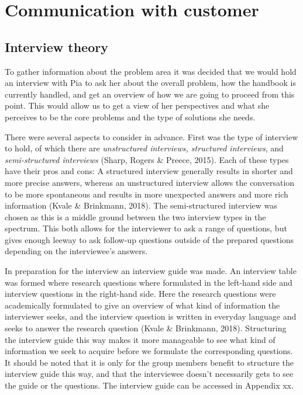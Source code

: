 \section{Communication with customer}

\subsection{Interview theory}

To gather information about the problem area it was decided that
we would hold an interview with Pia to ask her about the overall problem, how the handbook is currently handled, and get an overview of how we are going to proceed from this point. This would allow us to get a view of her perspectives and what she perceives to be the core problems and the type of solutions she needs.

There were several aspects to consider in advance. First was the type of interview to hold, of which there are \textit{unstructured interviews, structured interviews}, and \textit{semi-structured interviews} (Sharp, Rogers \& Preece, 2015). Each of these types have their pros and cons: A structured interview generally results in shorter and more precise answers, whereas an unstructured interview allows the conversation to be more spontaneous and results in more unexpected answers and more rich information (Kvale \& Brinkmann, 2018). The semi-structured interview was chosen as this is a middle ground between the two interview types in the spectrum. This both allows for the interviewer to ask a range of questions, but gives enough leeway to ask follow-up questions outside of the prepared questions depending on the interviewee’s answers.

In preparation for the interview an interview guide was made. An interview table was formed where research questions where formulated in the left-hand side and interview questions in the right-hand side. Here the research questions were academically formulated to give an overview of what kind of information the interviewer seeks, and the interview question is written in everyday language and seeks to answer the research question (Kvale \& Brinkmann, 2018). Structuring the interview guide this way makes it more manageable to see what kind of information we seek to acquire before we formulate the corresponding questions. It should be noted that it is only for the group members benefit to structure the interview guide this way, and that the interviewee doesn’t necessarily gets to see the guide or the questions. The interview guide can be accessed in Appendix xx.

